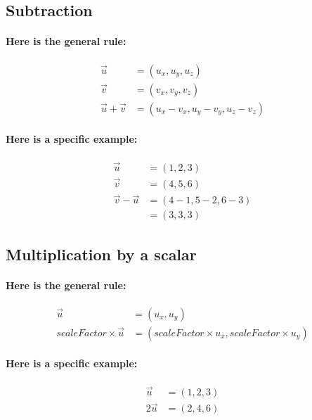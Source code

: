 \documentclass[twoside]{article}
\begin{document}
\subsection{Subtraction}

\paragraph{Here is the general rule:}

\begin{align*}
  \vec{u} & = (u_x, u_y, u_z) \\
  \vec{v} & = (v_x, v_y, v_z) \\
  \vec{u} + \vec{v} & = (u_x - v_x, u_y - v_y, u_z - v_z) 
  \end{align*}

\paragraph{Here is a specific example:}

\begin{align*}
  \vec{u} & = (1, 2, 3) \\
  \vec{v} & = (4, 5, 6) \\
  \vec{v} - \vec{u} & = (4 - 1, 5 - 2, 6 - 3) \\
                          & = (3, 3, 3)
  \end{align*}

\subsection{Multiplication by a scalar}

\paragraph{Here is the general rule:}

\begin{align*}
  \vec{u} & = (u_x, u_y) \\
   scaleFactor \times \vec{u} & = (scaleFactor \times u_x, scaleFactor \times u_y)
  \end{align*}

\paragraph{Here is a specific example:}

\begin{align*}
  \vec{u} & = (1, 2, 3) \\
  2 \vec{u} & = (2, 4, 6)
  \end{align*}
\end{document}
